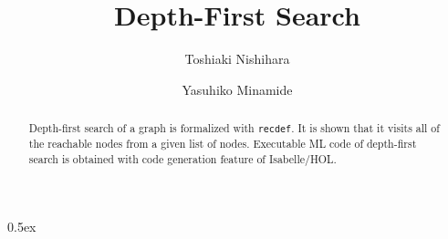 \documentclass[11pt,a4paper]{article}
\begin{document}
\title{Depth-First Search}
\author{Toshiaki Nishihara \and Yasuhiko Minamide}
\maketitle

\begin{abstract}
  Depth-first search of a graph is formalized with \texttt{recdef}. 
  It is shown that it visits all of the reachable nodes from a given list of 
  nodes. Executable ML code of depth-first search is obtained with code 
  generation feature of Isabelle/HOL.
\end{abstract}

\tableofcontents

\parindent 0pt\parskip 0.5ex


\end{document}
